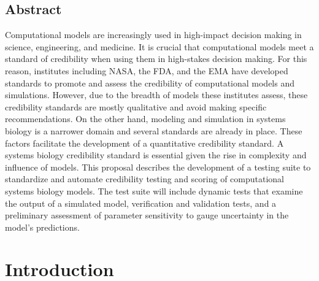 \documentclass[12pt]{report}
\begin{document}
\section*{Abstract}
Computational models are increasingly used in high-impact decision making in science, engineering, and medicine. It is crucial that computational models meet a standard of credibility when using them in high-stakes decision making. For this reason, institutes including NASA, the FDA, and the EMA have developed standards to promote and assess the credibility of computational models and simulations. However, due to the breadth of models these institutes assess, these credibility standards are mostly qualitative and avoid making specific recommendations. On the other hand, modeling and simulation in systems biology is a narrower domain and several standards are already in place. These factors facilitate the development of a quantitative credibility standard. A systems biology credibility standard is essential given the rise in complexity and influence of models. This proposal describes the development of a testing suite to standardize and automate credibility testing and scoring of computational systems biology models. The test suite will include dynamic tests that examine the output of a simulated model, verification and validation tests, and a preliminary assessment of parameter sensitivity to gauge uncertainty in the model's predictions. 

\tableofcontents



\chapter{Introduction}
\end{document}
